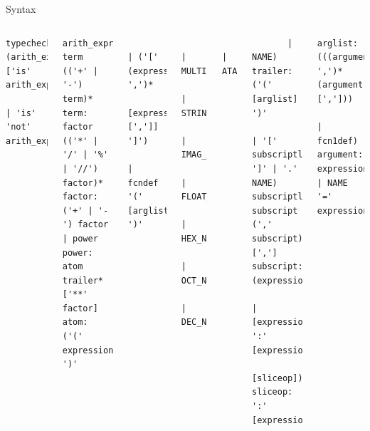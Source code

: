 \documentclass{beamer}
\begin{document}
\begin{frame}[fragile]{Syntax}
\begin{columns}[t]
\tiny{}
\begin{verbatim}
typecheck: (arith_expr ['is' arith_expr
             | 'is' 'not' arith_expr])
\end{verbatim}
\vspace{-0.8 cm}
\begin{verbatim}
arith_expr: term (('+' | '-') term)*
term: factor (('*' | '/' | '%' | '//') factor)*
factor: ('+' | '-') factor | power
power: atom trailer* ['**' factor]
atom: ('(' expression ')'
\end{verbatim}
\vspace{-0.8 cm}
\begin{verbatim}
       | ('[' (expression ',')*
             [expression [',']] ']')
       | fcndef '(' [arglist] ')'
\end{verbatim}
\vspace{-0.8 cm}
\begin{verbatim}
       | MULTILINESTRING
       | STRING
       | IMAG_NUMBER
       | FLOAT_NUMBER
       | HEX_NUMBER
       | OCT_NUMBER
       | DEC_NUMBER
\end{verbatim}
\vspace{-0.8 cm}
\begin{verbatim}
       | ATARG
\end{verbatim}
\vspace{-0.8 cm}
\begin{verbatim}
       | NAME)
trailer: ('(' [arglist] ')'
           | '[' subscriptlist ']' | '.' NAME)
subscriptlist: subscript (',' subscript)* [',']
subscript: (expression
           | [expression] ':' [expression]
             [sliceop])
sliceop: ':' [expression]
\end{verbatim}
\vspace{-0.8 cm}
\begin{verbatim}
arglist: (((argument ',')* (argument [',']))
           | fcn1def)
argument: expression | NAME '=' expression
\end{verbatim}
\end{columns}
\end{frame}
\end{document}
